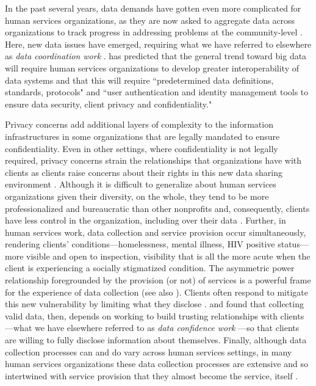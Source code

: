 In the past several years, data demands have gotten even more complicated for human services organizations, as they are now asked to aggregate data across organizations to track progress in addressing problems at the community-level \citep{Benjamin2018Policy, Bopp2017DbD, Erete2017EmpPart, Maxwell2016Data,Verma2016DrillDown}. Here, new data issues have emerged, requiring what we have referred to elsewhere as \textit{data coordination work} \citep{Benjamin2018Policy}. \citet{Schoech2010Interoperability} has predicted that the general trend toward big data will require human services organizations to develop greater interoperability of data systems and that this will require ``predetermined data definitions, standards, protocols" and ``user authentication and identity management tools to ensure data security, client privacy and confidentiality."

Privacy concerns add additional layers of complexity to the information infrastructures in some organizations that are legally mandated to ensure confidentiality. Even in other settings, where confidentiality is not legally required, privacy concerns strain the relationships that organizations have with clients as clients raise concerns about their rights in this new data sharing environment \citep{Sparks2010Broke}. Although it is difficult to generalize about human services organizations given their diversity, on the whole, they tend to be more professionalized and bureaucratic than other nonprofits and, consequently, clients have less control in the organization, including over their data \citep{Hasenfeld2010Orgs}. Further, in human services work, data collection and service provision occur simultaneously, rendering clients' conditions---homelessness, mental illness, HIV positive status---more visible and open to inspection, visibility that is all the more acute when the client is experiencing a socially stigmatized condition. The asymmetric power relationship foregrounded by the provision (or not) of services is a powerful frame for the experience of data collection (see also \cite {Borchorst2011You}). Clients often respond to mitigate this new vulnerability by limiting what they disclose \citep{Sparks2010Broke}. \citet{Carnochan2014Performance} and \citet{DeWitte2015Street} found that collecting valid data, then, depends on working to build trusting relationships with clients---what we have elsewhere referred to as \textit{data confidence work} \citep{Benjamin2018Policy}---so that clients are willing to fully disclose information about themselves. Finally, although data collection processes can and do vary across human services settings, in many human services organizations these data collection processes are extensive and so intertwined with service provision that they almost become the service, itself \citep{Benjamin2018Policy,Soss2011Discipline}.

